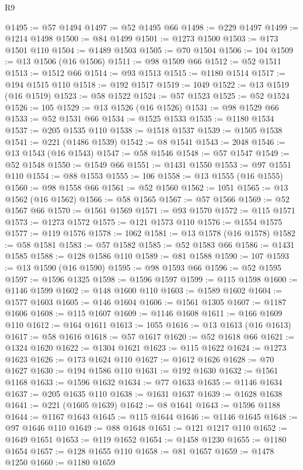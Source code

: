 \begin{lexlean}{R9}
\begin{coremodule}
@1495 := @57 @1494
@1497 := @52 @1495 @66
@1498 := @229 @1497
@1499 := @1214 @1498
@1500 := @84 @1499
@1501 := @1273 @1500
@1503 := @173 @1501 @110
@1504 := @1489 @1503
@1505 := @70 @1504
@1506 := 104
@1509 := @13 @1506 (@16 @1506)
@1511 := @98 @1509 @66
@1512 := @52 @1511
@1513 := @1512 @66
@1514 := @93 @1513
@1515 := @1180 @1514
@1517 := @194 @1515 @110
@1518 := @192 @1517
@1519 := 1049
@1522 := @13 @1519 (@16 @1519)
@1523 := @58 @1522
@1524 := @57 @1523
@1525 := @52 @1524
@1526 := 105
@1529 := @13 @1526 (@16 @1526)
@1531 := @98 @1529 @66
@1533 := @52 @1531 @66
@1534 := @1525 @1533
@1535 := @1180 @1534
@1537 := @205 @1535 @110
@1538 := @1518 @1537
@1539 := @1505 @1538
@1541 := @221 (@1486 @1539)
@1542 := @8 @1541
@1543 := 2048
@1546 := @13 @1543 (@16 @1543)
@1547 := @58 @1546
@1548 := @57 @1547
@1549 := @52 @1548
@1550 := @1549 @66
@1551 := @1431 @1550
@1553 := @97 @1551 @110
@1554 := @88 @1553
@1555 := 106
@1558 := @13 @1555 (@16 @1555)
@1560 := @98 @1558 @66
@1561 := @52 @1560
@1562 := 1051
@1565 := @13 @1562 (@16 @1562)
@1566 := @58 @1565
@1567 := @57 @1566
@1569 := @52 @1567 @66
@1570 := @1561 @1569
@1571 := @93 @1570
@1572 := @115 @1571
@1573 := @1273 @1572
@1575 := @121 @1573 @110
@1576 := @1554 @1575
@1577 := @119 @1576
@1578 := 1062
@1581 := @13 @1578 (@16 @1578)
@1582 := @58 @1581
@1583 := @57 @1582
@1585 := @52 @1583 @66
@1586 := @1431 @1585
@1588 := @128 @1586 @110
@1589 := @81 @1588
@1590 := 107
@1593 := @13 @1590 (@16 @1590)
@1595 := @98 @1593 @66
@1596 := @52 @1595
@1597 := @1596 @1325
@1598 := @1596 @1597
@1599 := @115 @1598
@1600 := @1146 @1599
@1602 := @148 @1600 @110
@1603 := @1589 @1602
@1604 := @1577 @1603
@1605 := @146 @1604
@1606 := @1561 @1305
@1607 := @1187 @1606
@1608 := @115 @1607
@1609 := @1146 @1608
@1611 := @166 @1609 @110
@1612 := @164 @1611
@1613 := 1055
@1616 := @13 @1613 (@16 @1613)
@1617 := @58 @1616
@1618 := @57 @1617
@1620 := @52 @1618 @66
@1621 := @1324 @1620
@1622 := @1304 @1621
@1623 := @115 @1622
@1624 := @1273 @1623
@1626 := @173 @1624 @110
@1627 := @1612 @1626
@1628 := @70 @1627
@1630 := @194 @1586 @110
@1631 := @192 @1630
@1632 := @1561 @1168
@1633 := @1596 @1632
@1634 := @77 @1633
@1635 := @1146 @1634
@1637 := @205 @1635 @110
@1638 := @1631 @1637
@1639 := @1628 @1638
@1641 := @221 (@1605 @1639)
@1642 := @8 @1641
@1643 := @1596 @1188
@1644 := @1167 @1643
@1645 := @115 @1644
@1646 := @1146 @1645
@1648 := @97 @1646 @110
@1649 := @88 @1648
@1651 := @121 @1217 @110
@1652 := @1649 @1651
@1653 := @119 @1652
@1654 := @1458 @1230
@1655 := @1180 @1654
@1657 := @128 @1655 @110
@1658 := @81 @1657
@1659 := @1478 @1250
@1660 := @1180 @1659

\end{coremodule}
\end{lexlean}
